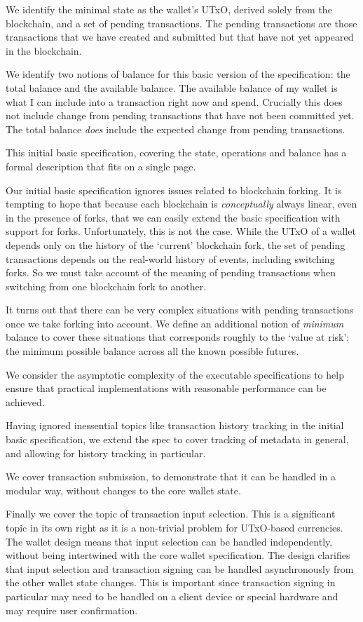 \documentclass{article}
\theoremstyle{definition}{
  \newtheorem{lemma}{Lemma}[section] %
  \newtheorem{definition}[lemma]{Definition}
}
\theoremstyle{theorem}{
  \newtheorem{invariant}[lemma]{Invariant}
  \newtheorem{proofobligation}[lemma]{Proof Obligation}
}
\numberwithin{equation}{lemma}
\begin{document}
We identify the minimal state as the wallet's UTxO, derived solely from the
blockchain, and a set of pending transactions. The pending transactions are
those transactions that we have created and submitted but that have not yet
appeared in the blockchain.

We identify two notions of balance for this basic version of the specification:
the total balance and the available balance. The available balance of my wallet
is what I can include into a transaction right now and spend. Crucially this
does not include change from pending transactions that have not been committed
yet. The total balance \emph{does} include the expected change from pending
transactions.

This initial basic specification, covering the state, operations and balance
has a formal description that fits on a single page.

Our initial basic specification ignores issues related to blockchain forking.
It is tempting to hope that because each blockchain is \emph{conceptually}
always linear, even in the presence of forks, that we can easily extend the
basic specification with support for forks. Unfortunately, this is not the
case. While the UTxO of a wallet depends only on the history of the `current'
blockchain fork, the set of pending transactions depends on the real-world
history of events, including switching forks. So we must take account of the
meaning of pending transactions when switching from one blockchain fork to
another.

It turns out that there can be very complex situations with pending transactions
once we take forking into account. We define an additional notion of
\emph{minimum} balance to cover these situations that corresponds roughly to
the `value at risk': the minimum possible balance across all the known possible
futures.

We consider the asymptotic complexity of the executable specifications to
help ensure that practical implementations with reasonable performance can be
achieved.

Having ignored inessential topics like transaction history tracking in the
initial basic specification, we extend the spec to cover tracking of metadata in
general, and allowing for history tracking in particular.

We cover transaction submission, to demonstrate that it can be handled in a
modular way, without changes to the core wallet state.

Finally we cover the topic of transaction input selection. This is a
significant topic in its own right as it is a non-trivial problem for UTxO-based
currencies. The wallet design means that input selection can be handled
independently, without being intertwined with the core wallet specification.
The design clarifies that input selection and transaction signing can be
handled asynchronously from the other wallet state changes. This is important
since transaction signing in particular may need to be handled on a client
device or special hardware and may require user confirmation.
\end{document}
